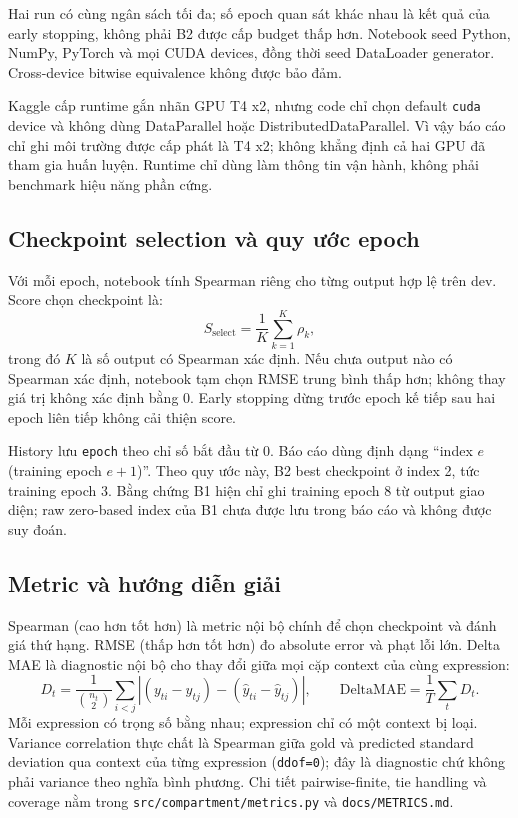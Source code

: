 \documentclass[11pt,a4paper]{article}
\newcommand{\code}[1]{\nolinkurl{#1}}
\begin{document}
Hai run có cùng ngân sách tối đa; số epoch quan sát khác nhau là kết quả của early stopping, không phải B2 được cấp budget thấp hơn. Notebook seed Python, NumPy, PyTorch và mọi CUDA devices, đồng thời seed DataLoader generator. Cross-device bitwise equivalence không được bảo đảm.

Kaggle cấp runtime gắn nhãn GPU T4 x2, nhưng code chỉ chọn default \code{cuda} device và không dùng DataParallel hoặc DistributedDataParallel. Vì vậy báo cáo chỉ ghi môi trường được cấp phát là T4 x2; không khẳng định cả hai GPU đã tham gia huấn luyện. Runtime chỉ dùng làm thông tin vận hành, không phải benchmark hiệu năng phần cứng.

\subsection{Checkpoint selection và quy ước epoch}

Với mỗi epoch, notebook tính Spearman riêng cho từng output hợp lệ trên dev. Score chọn checkpoint là:
\[
S_{\mathrm{select}}=\frac{1}{K}\sum_{k=1}^{K}\rho_k,
\]
trong đó $K$ là số output có Spearman xác định. Nếu chưa output nào có Spearman xác định, notebook tạm chọn RMSE trung bình thấp hơn; không thay giá trị không xác định bằng 0. Early stopping dừng trước epoch kế tiếp sau hai epoch liên tiếp không cải thiện score.

History lưu \code{epoch} theo chỉ số bắt đầu từ 0. Báo cáo dùng định dạng ``index $e$ (training epoch $e+1$)''. Theo quy ước này, B2 best checkpoint ở index 2, tức training epoch 3. Bằng chứng B1 hiện chỉ ghi training epoch 8 từ output giao diện; raw zero-based index của B1 chưa được lưu trong báo cáo và không được suy đoán.

\subsection{Metric và hướng diễn giải}

Spearman (cao hơn tốt hơn) là metric nội bộ chính để chọn checkpoint và đánh giá thứ hạng. RMSE (thấp hơn tốt hơn) đo absolute error và phạt lỗi lớn. Delta MAE là diagnostic nội bộ cho thay đổi giữa mọi cặp context của cùng expression:
\[
D_t=\frac{1}{\binom{n_t}{2}}\sum_{i<j}
\left|(y_{ti}-y_{tj})-(\hat y_{ti}-\hat y_{tj})\right|,
\qquad
\mathrm{DeltaMAE}=\frac{1}{T}\sum_t D_t.
\]
Mỗi expression có trọng số bằng nhau; expression chỉ có một context bị loại. Variance correlation thực chất là Spearman giữa gold và predicted standard deviation qua context của từng expression (\code{ddof=0}); đây là diagnostic chứ không phải variance theo nghĩa bình phương. Chi tiết pairwise-finite, tie handling và coverage nằm trong \code{src/compartment/metrics.py} và \code{docs/METRICS.md}.
\end{document}
